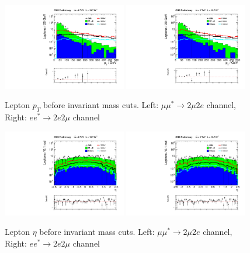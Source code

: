 \begin{figure}[hp!]
\begin{center}
\includegraphics[width=0.48\textwidth]{plot/Pt_2mu2e.pdf} 
\includegraphics[width=0.48\textwidth]{plot/Pt_2e2mu.pdf}
\end{center}
\caption{\label{fig:leptonPt}Lepton $p_{T}$ before invariant mass cuts. Left: $\mu\mu^{*}\rightarrow 2\mu2e$ channel, Right: $ee^{*}\rightarrow 2e2\mu$ channel}
\end{figure}


\begin{figure}[hp!]
\begin{center}
\includegraphics[width=0.48\textwidth]{plot/Eta_2mu2e.pdf} 
\includegraphics[width=0.48\textwidth]{plot/Eta_2e2mu.pdf}
\end{center}
\caption{\label{fig:leptonEta}Lepton $\eta$ before invariant mass cuts. Left: $\mu\mu^{*}\rightarrow 2\mu2e$ channel, Right: $ee^{*}\rightarrow 2e2\mu$ channel}
\end{figure}


